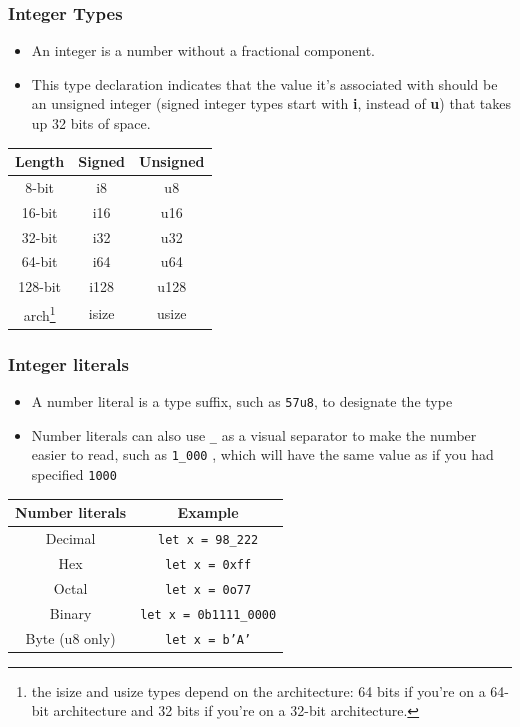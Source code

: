 \documentclass{beamer}
\begin{document}
	\begin{frame}[fragile]
		\frametitle{Integer Types}
		\begin{itemize}
			\item An integer is a number without a fractional component.
			\item This type declaration indicates that the value it’s associated with should be an unsigned integer (signed integer types start with \textbf{i}, instead of \textbf{u}) that takes up 32 bits of space.
		\end{itemize}
		
		\begin{table}
			\begin{tabular}{|c|c|c|}
				\hline
				\rowcolor{greyColor}
				Length & Signed & Unsigned \\
				\hline
				8-bit & i8 & u8 \\
				16-bit & i16 & u16 \\
				32-bit & i32 & u32 \\
				64-bit & i64 & u64 \\
				128-bit & i128 & u128 \\
				arch\footnote{the isize and usize types depend on the architecture: 64 bits if you’re on a 64-bit architecture and 32 bits if you’re on a 32-bit architecture.} & isize & usize \\
				\hline
			\end{tabular}
		\end{table}
		
	\end{frame}
	
	\begin{frame}[fragile]
		\frametitle{Integer literals}
		\begin{itemize}
			\item A number literal is a type suffix, such as \texttt{57u8}, to designate the type
			\item Number literals can also use \texttt{_} as a visual separator to make the number easier to read, such as  \texttt{1_000} , which will have the same value as if you had specified \texttt{1000}
		\end{itemize}
		\begin{table}
			\begin{tabular}{|c|c|}
				\hline
				\rowcolor{greyColor}
				Number literals	& Example \\
				\hline
				Decimal & \texttt{let x = 98_222} \\
				Hex & \texttt{let x = 0xff} \\
				Octal & \texttt{let x = 0o77} \\
				Binary & \texttt{let x = 0b1111_0000} \\
				Byte (u8 only) & \texttt{let x = b'A'} \\
				\hline
			\end{tabular}
		\end{table}
	\end{frame}
	
\end{document}
